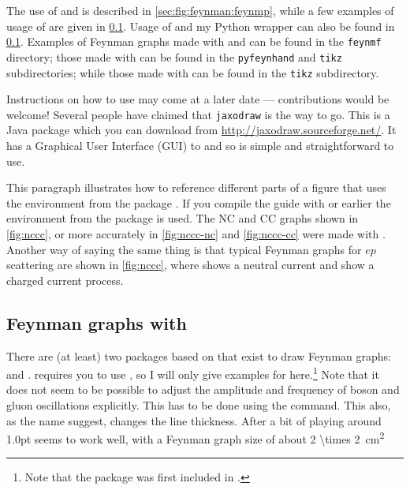 The use of  and  is
described in \cref{sec:fig:feynman:feynmp}, while a few
examples of usage of  are given in
\cref{sec:fig:feynman:tikz}.
Usage of  and my Python wrapper 
can also be found in \cref{sec:fig:feynman:tikz}.
Examples of Feynman graphs made
with  and  can be found in the \texttt{feynmf} directory;
those made with  can be found in the \texttt{pyfeynhand} and \texttt{tikz} subdirectories;
while those made with  can be found in the \texttt{tikz} subdirectory.

Instructions on how to use  may come at a later
date --- contributions would be welcome! Several people have claimed
that \texttt{jaxodraw} is the way to go. This is a Java package which
you can download from \url{http://jaxodraw.sourceforge.net/}. It has
a Graphical User Interface (GUI) to  and so is simple and
straightforward to use.

This paragraph illustrates how to reference different parts of a
figure that uses the environment  from the package .
If you compile the guide with  or earlier the
environment  from the package  is used.
The NC and CC graphs shown in
\cref{fig:nccc}, or more accurately in \cref{fig:nccc-nc} and
\cref{fig:nccc-cc} were made with . Another way of
saying the same thing is that typical Feynman graphs for \(ep\)
scattering are shown in \cref{fig:nccc}, where
 shows a neutral current and 
show a charged current process.


\subsection{Feynman graphs with \TikZ}%
\label{sec:fig:feynman:tikz}

There are (at least) two packages based on \TikZ that exist to draw Feynman graphs:
 and .
 requires you to use \LuaLaTeX,
so I will only give examples for  here.\footnote{%
Note that the  package was first included in .}
Note that it does not seem to be possible to adjust the amplitude and frequency
of boson and gluon oscillations explicitly.
This has to be done using the  command.
This also, as the name suggest, changes the line thickness.
After a bit of playing around \num{1.0}{pt} seems to work well,
with a Feynman graph size of about \SI[parse-numbers=false]{2 \times 2}{\cm^{2}}

